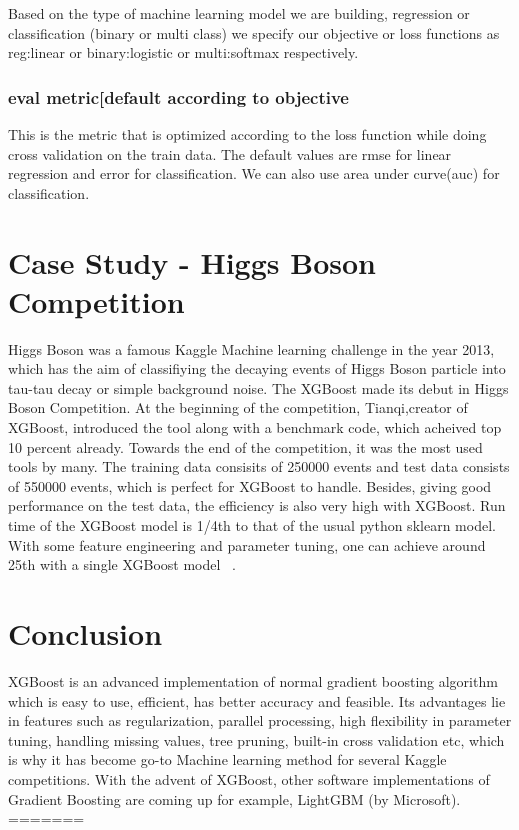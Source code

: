 Based on the type of machine learning model we are building, regression or
classification (binary or multi class) we specify our objective or loss
functions as reg:linear or binary:logistic or  multi:softmax respectively.

\subsubsection{eval metric[default according to objective}

This is the metric that is optimized according to the loss function while doing
cross  validation on the train data. The default values are rmse for linear
regression and  error  for classification. We can also use area under curve(auc)
for classification.

\section{Case Study - Higgs Boson Competition}

Higgs Boson was a famous Kaggle Machine learning challenge in the year 2013,
which has the  aim of classifiying the decaying events of Higgs Boson particle
into tau-tau decay or simple  background noise. The XGBoost made its debut in
Higgs Boson Competition. At the beginning of  the competition, Tianqi,creator of
XGBoost, introduced the tool along with a benchmark code,  which acheived top 10
percent already. Towards the end of the competition, it was the most used tools
by many.
The training data consisits of 250000 events and test data consists of
550000 events, which is perfect for XGBoost to handle. Besides, giving good
performance on the test data, the efficiency is also very high with XGBoost. Run
time of the XGBoost model is 1/4th to that of the usual python sklearn model.
With some feature engineering and parameter tuning, one can achieve around 25th
with a single XGBoost model ~\cite{hid-sp18-401-XGBoost-pdf}.

\section{Conclusion} 

 XGBoost is an advanced implementation of normal gradient boosting algorithm 
 which is easy to use, efficient, has better accuracy and feasible. Its 
 advantages lie in features such as regularization, parallel processing, high 
 flexibility in parameter tuning, handling missing values, tree pruning, 
 built-in cross validation etc, which is why it has become go-to Machine 
 learning method for several Kaggle competitions. With the advent of XGBoost, 
 other software implementations of Gradient Boosting are coming up for example, 
 LightGBM (by Microsoft).
=======

